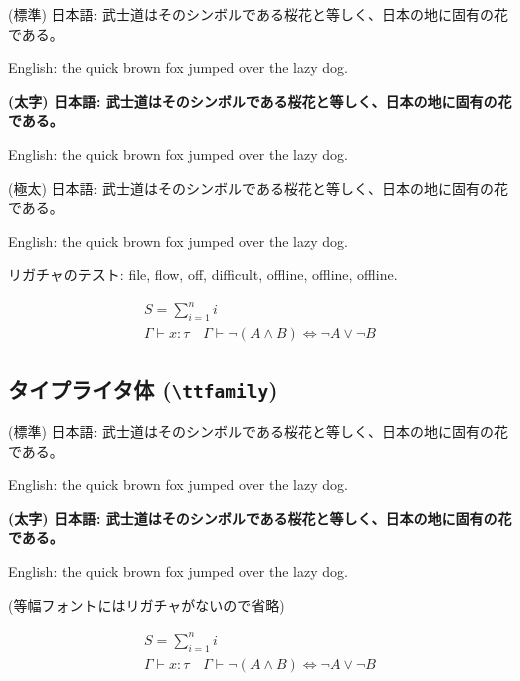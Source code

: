\documentclass[xelatex,a4paper,ja=standard]{bxjsarticle}
\newcommand{\jasample}{武士道はそのシンボルである桜花と等しく、日本の地に固有の花である。}
\begin{document}
{\mdseries (標準) 日本語: \jasample

English: the quick brown fox jumped over the lazy dog.}

{\bfseries (太字) 日本語: \jasample

English: the quick brown fox jumped over the lazy dog.}

{\ebseries (極太) 日本語: \jasample

English: the quick brown fox jumped over the lazy dog.}

{\mdseries リガチャのテスト: file, flow, off, difficult, offline, off\/line, off\textcompwordmark line.}

\normalsize
\begin{gather*}
    S = \sum_{i=1}^n i \\
    \Gamma \vdash x \colon \tau \quad \Gamma \vdash {\neg(A\land B)} \iff {\neg A} \lor {\neg B}
\end{gather*}

\subsection{タイプライタ体 (\texttt{\textbackslash ttfamily})}

\ttfamily\LARGE

{\mdseries (標準) 日本語: \jasample

English: the quick brown fox jumped over the lazy dog.}

{\bfseries (太字) 日本語: \jasample

English: the quick brown fox jumped over the lazy dog.}

\normalsize
(等幅フォントにはリガチャがないので省略)

\begin{gather*}
    S = \sum_{i=1}^n i \\
    \Gamma \vdash x \colon \tau \quad \Gamma \vdash {\neg(A\land B)} \iff {\neg A} \lor {\neg B}
\end{gather*}
\end{document}
